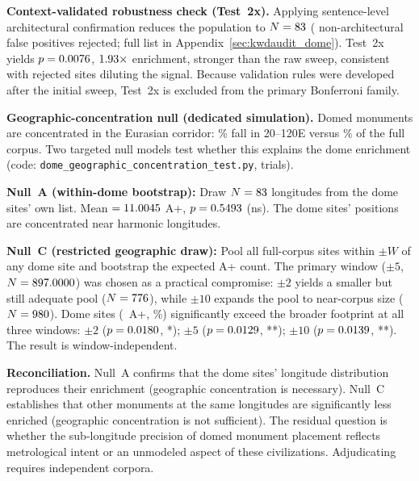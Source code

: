 \documentclass[HARVARD,twocolumn]{USG}
\begin{document}
\textbf{Context-validated robustness check (Test~2x).}
Applying sentence-level architectural confirmation reduces the population
to $N = 83$ (\NcircContextRejected{} non-architectural false positives
rejected; full list in Appendix~\ref{sec:kwdaudit_dome}).
Test~2x yields $p = 0.0076$, $1.93\times$ enrichment, stronger than the
raw sweep, consistent with rejected sites diluting the signal.
Because validation rules were developed after the initial sweep, Test~2x
is excluded from the primary Bonferroni family.

\textbf{Geographic-concentration null (dedicated simulation).}
\label{sec:geo_conc_null}
Domed monuments are concentrated in the Eurasian corridor:
\domeEurasianFraction\% fall in 20\textdegree--120\textdegree{}E
versus \fullCorpusEurasianFraction\% of the full corpus.
Two targeted null models test whether this explains the dome enrichment
(code: \texttt{dome\_geographic\_concentration\_test.py}, \simNperms{} trials).

\textbf{Null~A (within-dome bootstrap):} Draw $N = 83$ longitudes
from the dome sites' own list. Mean $= 11.0045$ A+,
$p = 0.5493$ (ns). The dome sites' positions are concentrated
near harmonic longitudes.

\textbf{Null~C (restricted geographic draw):} Pool all full-corpus sites
within $\pm W$\textdegree{} of any dome site and bootstrap the expected A+
count. The primary window ($\pm 5$\textdegree{}, $N = 897.0000$)
was chosen as a practical compromise: $\pm 2$\textdegree{} yields a smaller
but still adequate pool ($N = 776$), while
$\pm 10$\textdegree{} expands the pool to near-corpus size
($N = 980$). Dome sites (\NcircTierAp~A+, \NcircApRate\%) significantly
exceed the broader footprint at all three windows:
$\pm 2$\textdegree{} ($p = 0.0180$, *);
$\pm 5$\textdegree{} ($p = 0.0129$, **);
$\pm 10$\textdegree{} ($p = 0.0139$, **).
The result is window-independent.

\textbf{Reconciliation.}
Null~A confirms that the dome sites' longitude distribution reproduces their
enrichment (geographic concentration is necessary). Null~C establishes that
other monuments at the same longitudes are significantly less enriched
(geographic concentration is not sufficient). The residual question is whether
the sub-longitude precision of domed monument placement reflects metrological
intent or an unmodeled aspect of these civilizations. Adjudicating requires
independent corpora.
\end{document}
